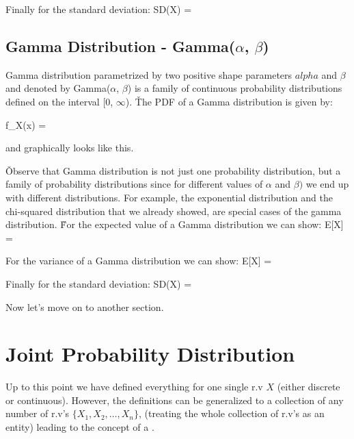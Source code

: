 Finally for the standard deviation:
\bse
SD(X) = 
\ese

\subsection{Gamma Distribution - Gamma($\alpha$, $\beta$)}

Gamma distribution parametrized by two positive shape parameters $alpha$ and $\beta$ and denoted by Gamma($\alpha$,
$\beta$) is a family of continuous probability distributions defined on the interval [0, $\infty$). \v

The PDF of a Gamma distribution is given by:

\bse
f_{X}(x) = 
\ese
\ed

and graphically looks like this.


\v

Observe that Gamma distribution is not just one probability distribution, but a family of probability distributions
since for different values of $\alpha$ and $\beta)$ we end up with different distributions. For example, the
exponential distribution and the chi-squared distribution that we already showed, are special cases of the gamma
distribution. \v

For the expected value of a Gamma distribution we can show:
\bse
E[X] = \frac{\alpha}{\beta}
\ese

For the variance of a Gamma distribution we can show:
\bse
E[X] = 
\ese

Finally for the standard deviation:
\bse
SD(X) = \frac{\sqrt{\alpha}}{\beta}
\ese

Now let's move on to another section.

\section{Joint Probability Distribution}

Up to this point we have defined everything for one single r.v $X$ (either discrete or continuous). However, the
definitions can be generalized to a collection of any number of r.v's $\{ X_{1}, X_{2}, \ldots, X_{n} \}$, (treating
the whole collection of r.v's as an entity) leading to the concept of a .

